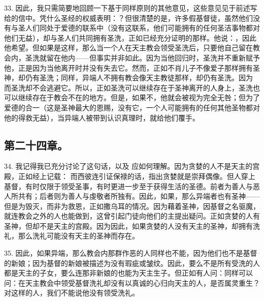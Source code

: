 33. 因此，我只需简要地回顾一下基于同样原则的其他意见，这些意见见于前述写给的信中。凭什么圣经的权威表明：？但很清楚的是，许多假基督徒，虽然他们没有与圣人们同处于爱德的联系中（没有这联系，他们可能拥有的任何圣洁事物都对他们无益），却与圣人们共同拥有圣洗，正如已经充分证明的那样。他说：，因此他希望。但如果是这样，那么当一个人在天主教会领受圣洗后，只要他自己留在教会内，圣洗就留在他内——但事实并非如此。因为当他回归时，圣洗并不重新赋予他，正是因为当他离开时并没有失去它。然而，正如不肖儿子不像爱子那样拥有圣神，却仍有圣洗；同样，异端人不拥有教会像天主教徒那样，却仍有圣洗。因为 而圣洗却不会逃避它。所以，正如圣洗可以继续存在于圣神离开的人身上，圣洗也可以继续存在于教会不在的地方。但是，如果不，他就会被视为完全无咎；但为了爱德的合一（这是圣神最大的恩赐，没有它，一个人可能拥有的任何其他圣物都对他的得救无益），当异端人被带到认识真理时，就给他们覆手。\par


\subsection{第二十四章。}

34. 我记得我已充分讨论了这句话，以及 应如何理解。因为贪婪的人不是天主的宫殿，正如经上记载： 而西彼连引证保禄的话，指出贪婪就是崇拜偶像。但人穿上基督，有时仅限于领受圣事，有时更进一步至于获得生活的圣德。前者为善人与恶人所共有；后者则为善人与虔敬者所独有。因此，如果，那么异端者也有圣神——但是为毁灭，而非为救恩，正如撒乌耳的情况。因为藉着圣神，因基督之名驱魔，就连教会之外的人也能做到，这曾引起门徒向他们的主提出疑问。正如贪婪的人有圣神，但却不是天主的宫殿。因为因此，如果贪婪的人没有天主的圣神，却拥有洗礼，那么洗礼可能没有天主的圣神而存在。\par

35. 因此，如果异端，那么教会内那群作恶的人同样也不能，因为他们也不是基督的新娘；因为基督的新娘被描述为没有瑕疵或皱纹。因此，要么不是所有受洗的人都是天主的子女，要么连那非新娘的也能为天主生子。但正如有人问：同样可以问：在天主教会中领受基督洗礼却没有以真诚的心归向天主的人，是否属灵重生？对这样的人，我们不能说他没有领受洗礼。\par


